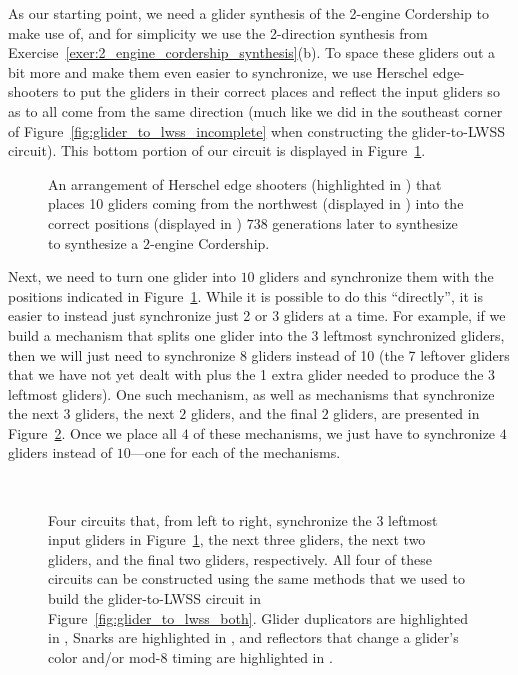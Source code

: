 As our starting point, we need a glider synthesis of the 2-engine Cordership to make use of, and for simplicity we use the 2-direction synthesis from Exercise~\ref{exer:2_engine_cordership_synthesis}(b). To space these gliders out a bit more and make them even easier to synchronize, we use Herschel edge-shooters to put the gliders in their correct places and reflect the input gliders so as to all come from the same direction (much like we did in the southeast corner of Figure~\ref{fig:glider_to_lwss_incomplete} when constructing the glider-to-LWSS circuit). This bottom portion of our circuit is displayed in Figure~\ref{fig:g_to_2engine_V}.

\begin{figure}[!htb]
	\centering
	\caption{An arrangement of Herschel edge shooters (highlighted in ) that places 10 gliders coming from the northwest (displayed in ) into the correct positions (displayed in ) $738$ generations later to synthesize to synthesize a $2$-engine Cordership.}\label{fig:g_to_2engine_V}
\end{figure}

Next, we need to turn one glider into $10$ gliders and synchronize them with the positions indicated in Figure~\ref{fig:g_to_2engine_V}. While it is possible to do this ``directly'', it is easier to instead just synchronize just 2 or 3 gliders at a time. For example, if we build a mechanism that splits one glider into the 3 leftmost synchronized gliders, then we will just need to synchronize 8 gliders instead of 10 (the 7 leftover gliders that we have not yet dealt with plus the 1 extra glider needed to produce the 3 leftmost gliders). One such mechanism, as well as mechanisms that synchronize the next $3$ gliders, the next $2$ gliders, and the final $2$ gliders, are presented in Figure~\ref{fig:2engine_synchronize}. Once we place all $4$ of these mechanisms, we just have to synchronize $4$ gliders instead of $10$---one for each of the mechanisms.

\begin{figure}[!htb]
	\centering
	 \ \  \ \  \ \ 
	\caption{Four circuits that, from left to right, synchronize the $3$ leftmost input gliders in Figure~\ref{fig:g_to_2engine_V}, the next three gliders, the next two gliders, and the final two gliders, respectively. All four of these circuits can be constructed using the same methods that we used to build the glider-to-LWSS circuit in Figure~\ref{fig:glider_to_lwss_both}. Glider duplicators are highlighted in , Snarks are highlighted in , and reflectors that change a glider's color and/or mod-$8$ timing are highlighted in .}\label{fig:2engine_synchronize}
\end{figure}

